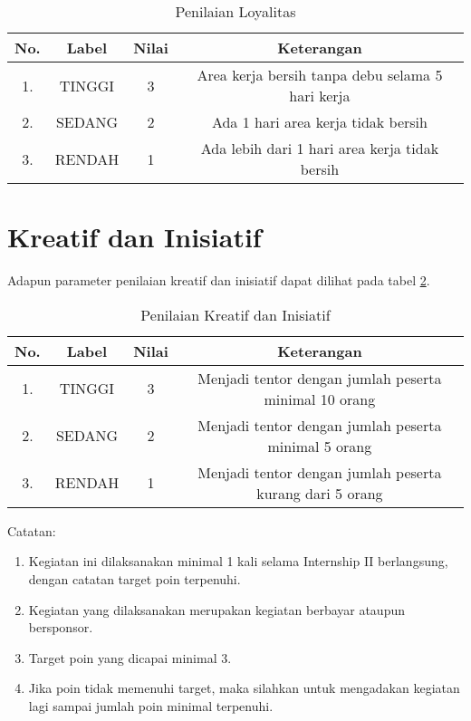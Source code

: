 \begin{table}[h]
\caption{Penilaian Loyalitas}
\centering
\begin{tabular}{|c|c|c|c|}
\hline
\textbf{No.}&\textbf{Label}&\textbf{Nilai}&\textbf{Keterangan}\\
\hline
1.&TINGGI&3&Area kerja bersih tanpa debu selama 5 hari kerja\\
\hline
2.&SEDANG&2&Ada 1 hari area kerja tidak bersih\\
\hline
3.&RENDAH&1&Ada lebih dari 1 hari area kerja tidak bersih\\
\hline
\end{tabular}
\label{tab:nilailoyalitas}
\end{table} 

\section{Kreatif dan Inisiatif}

Adapun parameter penilaian kreatif dan inisiatif dapat dilihat pada tabel \ref{tab:nilaikreatifinisiatif}.

\begin{table}[h]
\caption{Penilaian Kreatif dan Inisiatif}
\centering
\begin{tabular}{|c|c|c|c|}
\hline
\textbf{No.}&\textbf{Label}&\textbf{Nilai}&\textbf{Keterangan}\\
\hline
1.&TINGGI&3&Menjadi tentor dengan jumlah peserta minimal 10 orang\\
\hline
2.&SEDANG&2&Menjadi tentor dengan jumlah peserta minimal 5 orang\\
\hline
3.&RENDAH&1&Menjadi tentor dengan jumlah peserta kurang dari 5 orang\\
\hline
\end{tabular}
\label{tab:nilaikreatifinisiatif}
\end{table}

Catatan:
\begin{enumerate}
\item Kegiatan ini dilaksanakan minimal 1 kali selama Internship II berlangsung, dengan catatan target poin terpenuhi.
\item Kegiatan yang dilaksanakan merupakan kegiatan berbayar ataupun bersponsor.
\item Target poin yang dicapai minimal 3.
\item Jika poin tidak memenuhi target, maka silahkan untuk mengadakan kegiatan lagi sampai jumlah poin minimal terpenuhi.
\end{enumerate}